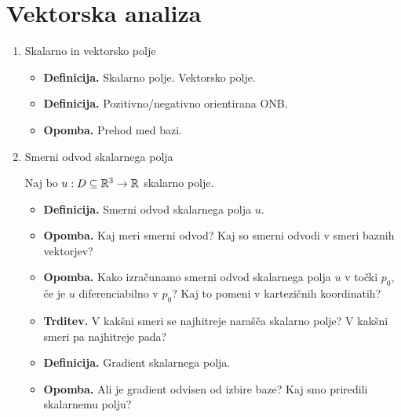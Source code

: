 \section{Vektorska analiza}
\begin{enumerate}
    \item Skalarno in vektorsko polje    
    \begin{itemize}
        \item \textbf{Definicija.} Skalarno polje. Vektorsko polje.
        \item \textbf{Definicija.} Pozitivno/negativno orientirana ONB.
        \item \textbf{Opomba.} Prehod med bazi.
    \end{itemize}

    \item Smerni odvod skalarnega polja
    
    Naj bo \(u: D \subseteq \mathbb{R}^3 \to \mathbb{R}\) skalarno polje.
    \begin{itemize}
        \item \textbf{Definicija.} Smerni odvod skalarnega polja \(u\).
        \item \textbf{Opomba.} Kaj meri smerni odvod? Kaj so smerni odvodi v smeri baznih vektorjev?
        \item \textbf{Opomba.} Kako izračunamo smerni odvod skalarnega polja \(u\) v točki \(p_0\), če je \(u\) diferenciabilno v \(p_0\)? Kaj to pomeni v kartezičnih koordinatih?
        \item \textbf{Trditev.} V kakšni smeri se najhitreje narašča skalarno polje? V kakšni smeri pa najhitreje pada?
        \item \textbf{Definicija.} Gradient skalarnega polja. 
        \item \textbf{Opomba.} Ali je gradient odvisen od izbire baze? Kaj smo priredili skalarnemu polju?


\end{itemize}
\end{enumerate}
